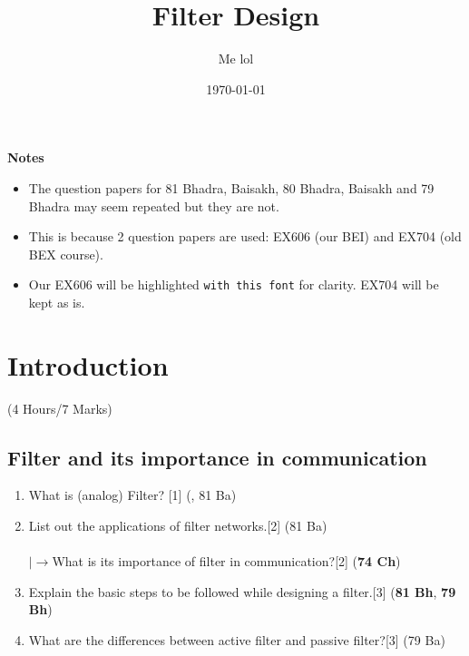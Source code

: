 \documentclass[12pt]{article}
\title{Filter Design}
\author{Me lol}
\date{\today}
\newcommand{\lb}{\\$\left|\rightarrow\right.$}
\begin{document}
\maketitle
\vspace{10cm}
\textbf{Notes}
\begin{itemize}
\item The question papers for 81 Bhadra, Baisakh, 80 Bhadra, Baisakh and 79 Bhadra may seem repeated but they are not.
\item This is because 2 question papers are used: EX606 (our BEI) and EX704 (old BEX course).
\item Our EX606 will be highlighted \texttt{with this font} for clarity. EX704 will be kept as is.
\end{itemize}
\pagebreak
\tableofcontents
\pagebreak

\section{Introduction}
	\begin{center}(4 Hours/7 Marks)\end{center}
	\subsection{Filter and its importance in communication}
	\begin{enumerate}
	\item What is (analog) Filter? \hfill [1] (, 81 Ba)
	\item List out the applications of filter networks.\hfill[2] (81 Ba)\\
	\lb What is its importance of filter in communication?\hfill[2] (\textbf{74 Ch})
	\item Explain the basic steps to be followed while designing a filter.\hfill[3] (\textbf{81 Bh}, \textbf{79 Bh})
	\item What are the differences between active filter and passive filter?\hfill[3] (79 Ba)
	\end{enumerate}
\end{document}
